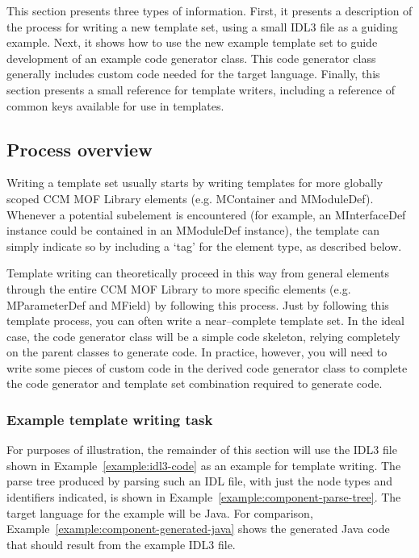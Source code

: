 This section presents three types of information. First, it presents a
description of the process for writing a new template set, using a small IDL3
file as a guiding example. Next, it shows how to use the new example template
set to guide development of an example code generator class. This code generator
class generally includes custom code needed for the target language. Finally,
this section presents a small reference for template writers, including a
reference of common keys available for use in templates.

\subsection{Process overview}

Writing a template set usually starts by writing templates for more globally
scoped CCM MOF Library elements (e.g. MContainer and MModuleDef). Whenever a
potential subelement is encountered (for example, an MInterfaceDef instance
could be contained in an MModuleDef instance), the template can simply indicate
so by including a `tag' for the element type, as described below.

Template writing can theoretically proceed in this way from general elements
through the entire CCM MOF Library to more specific elements (e.g. MParameterDef
and MField) by following this process. Just by following this template process,
you can often write a near--complete template set. In the ideal case, the code
generator class will be a simple code skeleton, relying completely on the parent
classes to generate code. In practice, however, you will need to write some
pieces of custom code in the derived code generator class to complete the code
generator and template set combination required to generate code.

\subsubsection{Example template writing task}

For purposes of illustration, the remainder of this section will use the IDL3
file shown in Example~\ref{example:idl3-code} as an example for template
writing. The parse tree produced by parsing such an IDL file, with just the node
types and identifiers indicated, is shown in
Example~\ref{example:component-parse-tree}. The target language for the example
will be Java. For comparison, Example~\ref{example:component-generated-java}
shows the generated Java code that should result from the example IDL3 file.

